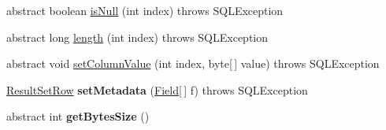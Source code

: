 \begin{DoxyCompactItemize}
\item 
abstract boolean \mbox{\hyperlink{classcom_1_1mysql_1_1jdbc_1_1_result_set_row_a96243f8e7eb839c4c233a2e4aa1cfb6b}{is\+Null}} (int index)  throws S\+Q\+L\+Exception
\item 
abstract long \mbox{\hyperlink{classcom_1_1mysql_1_1jdbc_1_1_result_set_row_a7d2e1a3d54533e0655afdc0a411808ed}{length}} (int index)  throws S\+Q\+L\+Exception
\item 
abstract void \mbox{\hyperlink{classcom_1_1mysql_1_1jdbc_1_1_result_set_row_a39c9cab871e6878715135801daa3b09d}{set\+Column\+Value}} (int index, byte\mbox{[}$\,$\mbox{]} value)  throws S\+Q\+L\+Exception
\item 
\mbox{\label{classcom_1_1mysql_1_1jdbc_1_1_result_set_row_a2fbba370e0b023b2138d373f26430930}} 
\mbox{\hyperlink{classcom_1_1mysql_1_1jdbc_1_1_result_set_row}{Result\+Set\+Row}} {\bfseries set\+Metadata} (\mbox{\hyperlink{classcom_1_1mysql_1_1jdbc_1_1_field}{Field}}\mbox{[}$\,$\mbox{]} f)  throws S\+Q\+L\+Exception 
\item 
\mbox{\label{classcom_1_1mysql_1_1jdbc_1_1_result_set_row_af2febed19df5e74579b5c6db88583a81}} 
abstract int {\bfseries get\+Bytes\+Size} ()
\end{DoxyCompactItemize}
